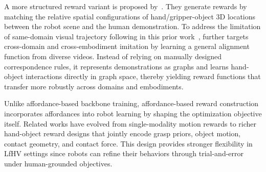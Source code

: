 \documentclass[Afour,sageh,times]{sagej}
\begin{document}
A more structured reward variant is proposed by~\cite{sieb2020graph}. They generate rewards by matching the relative spatial configurations of hand/gripper-object 3D locations between the robot scene and the human demonstration. To address the limitation of same-domain visual trajectory following in this prior work~\citep{sieb2020graph}, \cite{kumar2023graph} further targets cross-domain and cross-embodiment imitation by learning a general alignment function from diverse videos. Instead of relying on manually designed correspondence rules, it represents demonstrations as graphs and learns hand-object interactions directly in graph space, thereby yielding reward functions that transfer more robustly across domains and embodiments. 


Unlike affordance-based backbone training, affordance-based reward construction incorporates affordances into robot learning by shaping the optimization objective itself. Related works have evolved from single-modality motion rewards to richer hand-object reward designs that jointly encode grasp priors, object motion, contact geometry, and contact force. This design provides stronger flexibility in LfHV settings since robots can refine their behaviors through trial-and-error under human-grounded objectives. 
\end{document}
